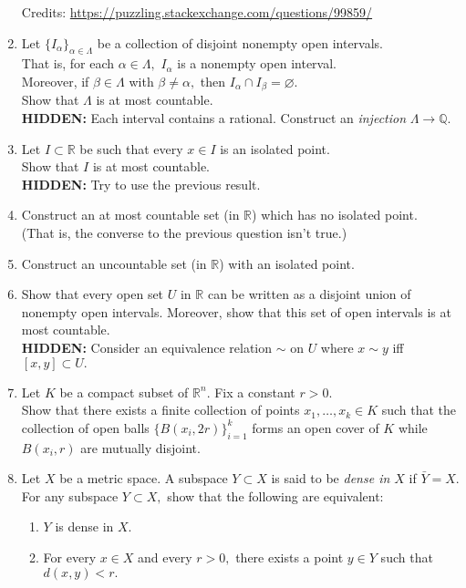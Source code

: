 \documentclass[12pt]{article}
\theoremstyle{definition}
\numberwithin{thm}{section}
\let\emptyset\varnothing
\newcommand{\hint}[1]{\textbf{HIDDEN:} {\color[rgb]{0.95, 0.95, 0.95}#1}}
\begin{document}
\begin{enumerate}
	Credits: \url{https://puzzling.stackexchange.com/questions/99859/}
	\item Let $\{I_\alpha\}_{\alpha \in \Lambda}$ be a collection of disjoint nonempty open intervals. \\
	That is, for each $\alpha \in \Lambda,$ $I_\alpha$ is a nonempty open interval. \\
	Moreover, if $\beta \in \Lambda$ with $\beta \neq \alpha,$ then $I_\alpha \cap I_\beta = \emptyset.$\\
	Show that $\Lambda$ is at most countable.\\
	\hint{Each interval contains a rational. Construct an \emph{injection} $\Lambda \to \mathbb{Q}.$}
	\item Let $I \subset \mathbb{R}$ be such that every $x \in I$ is an isolated point.\\
	Show that $I$ is at most countable.\\
	\hint{Try to use the previous result.}
	\item Construct an at most countable set (in $\mathbb{R}$) which has no isolated point.\\
	(That is, the converse to the previous question isn't true.)
	\item Construct an uncountable set (in $\mathbb{R}$) with an isolated point.
	\item Show that every open set $U$ in $\mathbb{R}$ can be written as a disjoint union of nonempty open intervals. Moreover, show that this set of open intervals is at most countable.\\
	\hint{Consider an equivalence relation $\sim$ on $U$ where $x \sim y$ iff $[x, y] \subset U.$}
	\item Let $K$ be a compact subset of $\mathbb{R}^n$. Fix a constant $r>0.$ \\
	Show that there exists a finite collection of points $x_1, \ldots, x_k\in K$ such that the collection of open balls $\{B(x_i,2r)\}_{i=1}^k$ forms an open cover of $K$ while $B(x_i, r)$ are mutually disjoint.
	\item Let $X$ be a metric space. A subspace $Y \subset X$ is said to be \emph{dense in $X$} if $\bar{Y} = X.$\\
	For any subspace $Y \subset X,$ show that the following are equivalent:
	\begin{enumerate}
		\item $Y$ is dense in $X.$
		\item For every $x \in X$ and every $r > 0,$ there exists a point $y \in Y$ such that $d(x, y) < r.$\\

\end{enumerate}
\end{enumerate}
\end{document}

